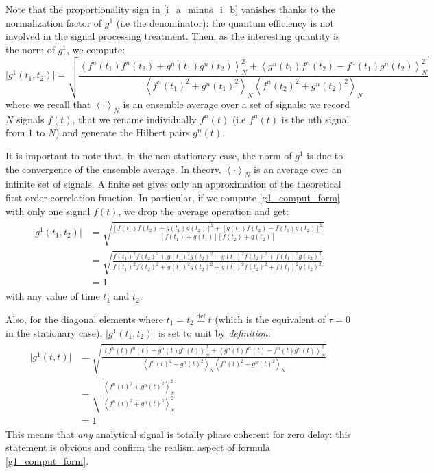 \documentclass[10pt]{report}
\begin{document}
Note that the proportionality sign in \eqref{i_a_minus_i_b} vanishes thanks to the normalization factor of $g^1$ (i.e the denominator): the quantum efficiency is not involved in the signal processing treatment. Then, as the interesting quantity is the norm of $g^1$, we compute:
\begin{equation}
\label{g1_comput_form}
\vert g^1(t_1, t_2) \vert = \sqrt{\frac{\left\langle f^n(t_1)f^n(t_2) + g^n(t_1)g^n(t_2) \right\rangle^2_N + \left\langle g^n(t_1)f^n(t_2) - f^n(t_1)g^n(t_2) \right\rangle^2_N}{\left\langle f^n(t_1)^2 + g^n(t_1)^2 \right\rangle_N \left\langle f^n(t_2)^2 + g^n(t_2)^2 \right\rangle_N}}
\end{equation}
where we recall that $\left\langle \cdot \right\rangle_N$ is an ensemble average over a set of signals: we record $N$ signals $f(t)$, that we rename individually $f^n(t)$ (i.e $f^n(t)$ is the nth signal from $1$ to $N$) and generate the Hilbert pairs $g^n(t)$.

It is important to note that, in the non-stationary case, the norm of $g^1$ is due to the convergence of the ensemble average. In theory, $\left\langle \cdot \right\rangle_N$ is an average over an infinite set of signals. A finite set gives only an approximation of the theoretical first order correlation function. In particular, if we compute \eqref{g1_comput_form} with only one signal $f(t)$, we drop the average operation and get:
\begin{align}
\begin{split}
\vert g^1(t_1, t_2) \vert &= \sqrt{\frac{\left[f(t_1)f(t_2) + g(t_1)g(t_2) \right]^2 + \left[g(t_1)f(t_2) - f(t_1)g(t_2) \right]^2}{\left[f(t_1) + g(t_1) \right] \left[ f(t_2) + g(t_2) \right]}}\\
&= \sqrt{\frac{f(t_1)^2f(t_2)^2 + g(t_1)^2g(t_2)^2 + g(t_1)^2f(t_2)^2 + f(t_1)^2g(t_2)^2}{f(t_1)^2f(t_2)^2 + g(t_1)^2g(t_2)^2 + g(t_1)^2f(t_2)^2 + f(t_1)^2g(t_2)^2}}\\
&= 1
\end{split}
\end{align}
with any value of time $t_1$ and $t_2$.

Also, for the diagonal elements where $t_1=t_2\stackrel{\text{def}}{=}t$ (which is the equivalent of $\tau = 0$ in the stationary case), $\vert g^1(t_1, t_2) \vert$ is set to unit by \textit{definition}:
\begin{align}
\begin{split}
\vert g^1(t, t) \vert &= \sqrt{\frac{\left\langle f^n(t)f^n(t) + g^n(t)g^n(t) \right\rangle^2_N + \left\langle g^n(t)f^n(t) - f^n(t)g^n(t) \right\rangle^2_N}{\left\langle f^n(t)^2 + g^n(t)^2 \right\rangle_N \left\langle f^n(t)^2 + g^n(t)^2 \right\rangle_N}}\\
&= \sqrt{\frac{\left\langle f^n(t)^2 + g^n(t)^2 \right\rangle^2_N}{\left\langle f^n(t)^2 + g^n(t)^2 \right\rangle_N^2}}\\
&= 1
\end{split}
\end{align}
This means that \textit{any} analytical signal is totally phase coherent for zero delay: this statement is obvious and confirm the realism aspect of formula \ref{g1_comput_form}.
\end{document}
